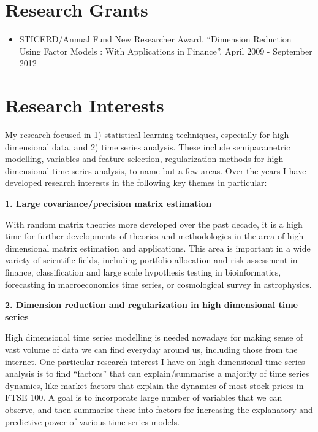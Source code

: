 \documentclass[overlapped,line,letterpaper]{res}
\begin{document}
\begin{resume}
\begin{itemize}
\end{itemize}


\section{Research Grants}
\begin{itemize}
\item[$\bullet$] STICERD/Annual Fund New Researcher Award. ``Dimension Reduction Using Factor Models : With Applications in Finance''. April 2009 - September 2012
\end{itemize}





\section{Research Interests}
My research focused in 1) statistical learning techniques, especially for high dimensional data, and 2) time series analysis. These include semiparametric modelling, variables and feature selection, regularization methods for high dimensional time series analysis, to name but a few areas. Over the years I have developed research interests in the following key themes in particular:

{\bf 1. Large covariance/precision matrix estimation}

With random matrix theories more developed over the past decade, it is a high time for further developments of theories and methodologies in the area of high dimensional matrix estimation and applications. This area is important in a wide variety of scientific fields, including portfolio allocation and risk assessment in finance, classification and large scale hypothesis testing in bioinformatics, forecasting in macroeconomics time series, or cosmological survey in astrophysics.

{\bf 2. Dimension reduction and regularization in high dimensional time series}

High dimensional time series modelling is needed nowadays for making sense of vast volume of data we can find everyday around us, including those from the internet. One particular research interest I have on high dimensional time series analysis is to find ``factors'' that can explain/summarise a majority of time series dynamics, like market factors that explain the dynamics of most stock prices in FTSE 100. A goal is to incorporate large number of variables that we can observe, and then summarise these into factors for increasing the explanatory and predictive power of various time series models.


\end{resume}
\end{document}
